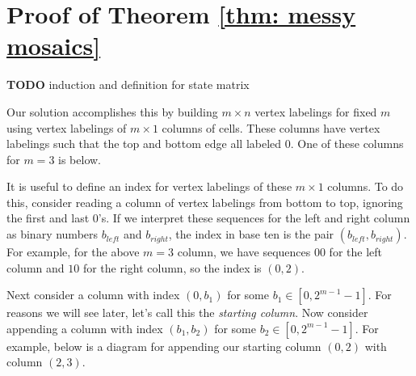 \documentclass[12pt]{article}
\theoremstyle{plain}
\theoremstyle{definition}
\theoremstyle{remark}
\theoremstyle{definition}
\newcommand{\cell}[4]{ \draw[thick] ( #1 , #2 ) rectangle ( #3 , #4 );}
\newcommand{\lablnode}[3]{\node[shape=circle,draw=none,fill=none, inner sep=0pt,minimum size=5pt] (A) at ( #1 , #2 ) {#3};}
\newcommand{\lablvertex}[3]{\node[shape=circle,draw=none,fill=white, inner sep=2pt,minimum size=5pt] (A) at ( #1 , #2 ) {#3};}
\begin{document}
\section{Proof of Theorem \ref{thm: messy mosaics}}

\textbf{TODO} induction and definition for state matrix

Our solution accomplishes this by building $m \times n$ vertex labelings for fixed $m$ using vertex labelings of $m \times 1$ columns of cells. These columns have vertex labelings such that the top and bottom edge all labeled $0$. One of these columns for $m=3$ is below.

\begin{center}
\end{center}

It is useful to define an index for vertex labelings of these $m \times 1$ columns. To do this, consider reading a column of vertex labelings from bottom to top, ignoring the first and last $0$'s. If we interpret these sequences for the left and right column as binary numbers $b_{left}$ and $b_{right}$, the index in base ten is the pair $(b_{left}, b_{right})$. For example, for the above $m=3$ column, we have sequences $00$ for the left column and $10$ for the right column, so the index is $(0,2)$.

Next consider a column with index $(0, b_{1})$ for some $b_{1} \in [0,2^{m-1}-1]$. For reasons we will see later, let's call this the \textit{starting column}. Now consider appending a column with index $(b_{1}, b_{2})$ for some $b_{2} \in [0,2^{m-1}-1]$. For example, below is a diagram for appending our starting column $(0,2)$ with column $(2,3)$. 
\end{document}
